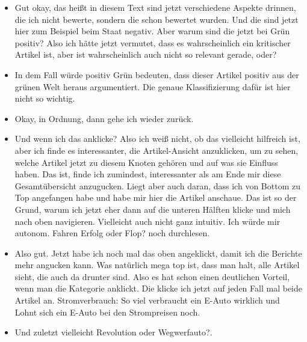 {\begin{itemize}[]
                  \flqq Rohstoffe für E-Auto Akku\frqq{} - Da gibt es ja immer verschiedene Ansichten für die Rohstoffe von so einem E-Auto Akku.
                  Von daher hätte ich das jetzt einfach angeklickt, weil es halt am interessantesten klingt.
            \item {} Gut okay, das heißt in diesem Text sind jetzt verschiedene Aspekte drinnen, die ich nicht bewerte, sondern die schon bewertet wurden.
                  Und die sind jetzt hier zum Beispiel beim Staat negativ.
                  Aber warum sind die jetzt bei Grün positiv?
                  Also ich hätte jetzt vermutet, dass es wahrscheinlich ein kritischer Artikel ist, aber ist wahrscheinlich auch nicht so relevant gerade, oder?
            \item {} In dem Fall würde positiv Grün bedeuten, dass dieser Artikel positiv aus der grünen Welt heraus argumentiert.
                  Die genaue Klassifizierung dafür ist hier nicht so wichtig.
            \item {} Okay, in Ordnung, dann gehe ich wieder zurück.
            \item {} Und wenn ich das anklicke?
                  Also ich weiß nicht, ob das vielleicht hilfreich ist, aber ich finde es interessanter, die Artikel-Ansicht anzuklicken, um zu sehen, welche Artikel jetzt zu diesem Knoten gehören und auf was sie Einfluss haben.
                  Das ist, finde ich zumindest, interessanter als am Ende mir diese Gesamtübersicht anzugucken.
                  Liegt aber auch daran, dass ich von Bottom zu Top angefangen habe und habe mir hier die Artikel anschaue.
                  Das ist so der Grund, warum ich jetzt eher dann auf die unteren Hälften klicke und mich nach oben navigieren.
                  Vielleicht auch nicht ganz intuitiv.
                  Ich würde mir \flqq autonom. Fahren Erfolg oder Flop?\frqq{} noch durchlesen.
            \item {} Also gut. Jetzt habe ich noch mal das oben angeklickt, damit ich die Berichte mehr angucken kann.
                  Was natürlich mega top ist, dass man halt, alle Artikel sieht, die auch da drunter sind.
                  Also es hat schon einen deutlichen Vorteil, wenn man die Kategorie anklickt.
                  Die klicke ich jetzt auf jeden Fall mal beide Artikel an.
                  \flqq Stromverbrauch: So viel verbraucht ein E-Auto wirklich\frqq{} und \flqq Lohnt sich ein E-Auto bei den Strompreisen noch\frqq{}.
            \item {} Und zuletzt vielleicht \flqq Revolution oder Wegwerfauto?\frqq{}.

\end{itemize}}
